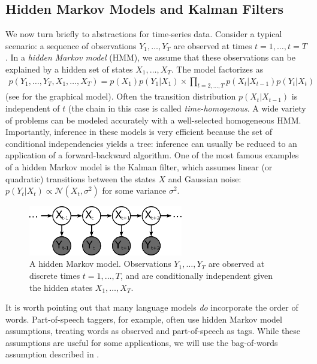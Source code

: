 \subsection{Hidden Markov Models and Kalman Filters}
We now turn briefly to abstractions for time-series data.  Consider a
typical scenario: a sequence of observations $Y_1, \ldots, Y_T$ are
observed at times $t=1, \ldots, t=T$.  In a \emph{hidden Markov model}
(HMM), we assume that these observations can be explained by a hidden set of states $X_1, \ldots, X_T$.  The model factorizes as
\begin{align}
  p(Y_1, \ldots, Y_T, X_1, \ldots, X_T) = p(X_1) p(Y_1 | X_1) \times \prod_{t=2, \ldots, T} p(X_t | X_{t-1}) p(Y_t | X_t)
\end{align}
(see  for the graphical model).  Often the transition
distribution $p(X_t | X_{t-1})$ is independent of $t$ (the chain in
this case is called \emph{time-homogenous}.  A wide variety of
problems can be modeled accurately with a well-selected homogeneous
HMM.  Importantly, inference in these models is very efficient because
the set of conditional independencies yields a tree: inference can
usually be reduced to an application of a forward-backward algorithm.
One of the most famous examples of a hidden Markov model is the Kalman
filter, which assumes linear (or quadratic) transitions between the
states $X$ and Gaussian noise: $p(Y_t | X_t) \propto \mathcal{N}(X_t,
\sigma^2)$ for some variance $\sigma^2$.
\begin{figure}
  \begin{center}
  \includegraphics[width=0.6\textwidth]{chapter_introductory_material/figs/hmm_gm.pdf}
  \end{center}
  \caption{A hidden Markov model.  Observations $Y_1, \ldots, Y_T$ are observed at discrete times $t=1, \ldots, T$, and are conditionally independent given the hidden states $X_1, \ldots, X_T$.}
  \label{figure:hmm_gm}
\end{figure}

It is worth pointing out that many language models \emph{do}
incorporate the order of words.  Part-of-speech taggers, for example,
often use hidden Markov model assumptions, treating words as observed
and part-of-speech as tags.  While these assumptions are useful for
some applications, we will use the bag-of-words assumption described
in .

